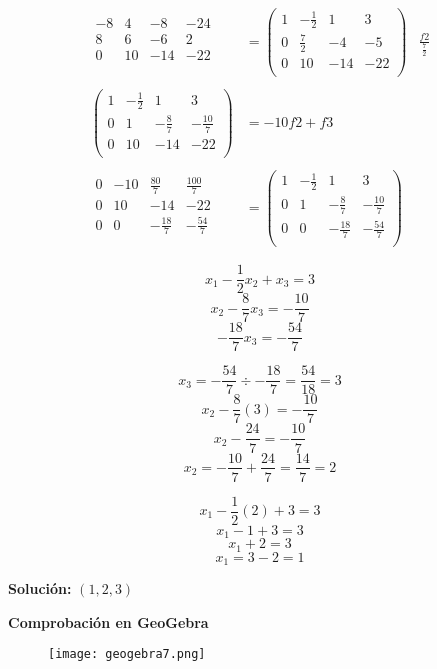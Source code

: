 \[
    \begin{aligned}
        \begin{array}{ccc|c}
            -8 & 4 & -8 & -24 \\
            8 & 6 & -6 & 2 \\
            \hline
            0 & 10 & -14 & -22 \\
        \end{array} & =
        \left(
            \begin{array}{ccc|c}
                1 & -\frac{1}{2} & 1 & 3 \\
                0 & \frac{7}{2} & -4 & -5 \\
                0 & 10 & -14 & -22 \\
            \end{array}
        \right) & \frac{f2}{\frac{7}{2}} \\ \\
        \left(
            \begin{array}{ccc|c}
                1 & -\frac{1}{2} & 1 & 3 \\
                0 & 1 & -\frac{8}{7} & -\frac{10}{7} \\
                0 & 10 & -14 & -22 \\
            \end{array}
        \right) & = -10f2+f3 \\ \\
        \begin{array}{ccc|c}
            0 & -10 & \frac{80}{7} & \frac{100}{7} \\
            0 & 10 & -14 & -22 \\
            \hline
            0 & 0 & -\frac{18}{7} & -\frac{54}{7} \\
        \end{array} & =
        \left(
            \begin{array}{ccc|c}
                1 & -\frac{1}{2} & 1 & 3 \\
                0 & 1 & -\frac{8}{7} & -\frac{10}{7} \\
                0 & 0 & -\frac{18}{7} & -\frac{54}{7} \\
            \end{array}
        \right)
    \end{aligned}
\]

\[x_1-\frac{1}{2}x_2+x_3=3\]
\[x_2-\frac{8}{7}x_3=-\frac{10}{7}\]
\[-\frac{18}{7}x_3=-\frac{54}{7}\]

\[x_3=-\frac{54}{7}\div-\frac{18}{7}=\frac{54}{18}=3\]
\[x_2-\frac{8}{7}(3)=-\frac{10}{7}\]
\[x_2-\frac{24}{7}=-\frac{10}{7}\]
\[x_2=-\frac{10}{7}+\frac{24}{7}=\frac{14}{7}=2\]

\[x_1-\frac{1}{2}(2)+3=3\]
\[x_1-1+3=3\]
\[x_1+2=3\]
\[x_1=3-2=1\]

\begin{center}
    \textbf{Solución:} $(1,2,3)$ 
\end{center}

\newpage
\textbf{Comprobación en GeoGebra}
\begin{figure}[ht!]
    \texttt{[image: geogebra7.png]}
\end{figure}
